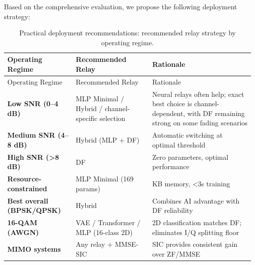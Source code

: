 Based on the comprehensive evaluation, we propose the following deployment strategy:

\begin{longtable}[]{@{}
  >{\raggedright\arraybackslash}p{}
  >{\raggedright\arraybackslash}p{}
  >{\raggedright\arraybackslash}p{}@{}}
\caption{Practical deployment recommendations: recommended relay strategy by operating regime.}\label{tbl:table32}\tabularnewline
\toprule\noalign{}
\begin{minipage}[b]{\linewidth}\raggedright
Operating Regime
\end{minipage} & \begin{minipage}[b]{\linewidth}\raggedright
Recommended Relay
\end{minipage} & \begin{minipage}[b]{\linewidth}\raggedright
Rationale
\end{minipage} \\
\midrule\noalign{}
\endfirsthead
\toprule\noalign{}
\begin{minipage}[b]{\linewidth}\raggedright
Operating Regime
\end{minipage} & \begin{minipage}[b]{\linewidth}\raggedright
Recommended Relay
\end{minipage} & \begin{minipage}[b]{\linewidth}\raggedright
Rationale
\end{minipage} \\
\midrule\noalign{}
\endhead
\bottomrule\noalign{}
\endlastfoot
\textbf{Low SNR (0--4 dB)} & MLP Minimal / Hybrid / channel-specific selection & Neural relays often help; exact best choice is channel-dependent, with DF remaining strong on some fading scenarios \\
\textbf{Medium SNR (4--8 dB)} & Hybrid (MLP + DF) & Automatic switching at optimal threshold \\
\textbf{High SNR (\textgreater8 dB)} & DF & Zero parameters, optimal performance \\
\textbf{Resource-constrained} & MLP Minimal (169 params) & 0.7 KB memory, \textless3s training \\
\textbf{Best overall (BPSK/QPSK)} & Hybrid & Combines AI advantage with DF reliability \\
\textbf{16-QAM (AWGN)} & VAE / Transformer / MLP (16-class 2D) & 2D classification matches DF; eliminates I/Q splitting floor \\
\textbf{MIMO systems} & Any relay + MMSE-SIC & SIC provides consistent gain over ZF/MMSE \\
\end{longtable}

